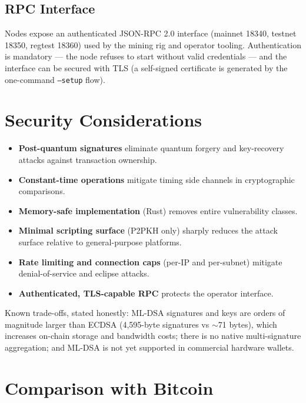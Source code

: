 \documentclass[11pt,a4paper]{article}
\begin{document}
\subsection{RPC Interface}

Nodes expose an authenticated JSON-RPC 2.0 interface (mainnet 18340, testnet 18350, regtest 18360) used by the mining rig and operator tooling. Authentication is mandatory --- the node refuses to start without valid credentials --- and the interface can be secured with TLS (a self-signed certificate is generated by the one-command \texttt{--setup} flow).

\section{Security Considerations}

\begin{itemize}[leftmargin=1.5em,itemsep=2pt]
\item \textbf{Post-quantum signatures} eliminate quantum forgery and key-recovery attacks against transaction ownership.
\item \textbf{Constant-time operations} mitigate timing side channels in cryptographic comparisons.
\item \textbf{Memory-safe implementation} (Rust) removes entire vulnerability classes.
\item \textbf{Minimal scripting surface} (P2PKH only) sharply reduces the attack surface relative to general-purpose platforms.
\item \textbf{Rate limiting and connection caps} (per-IP and per-subnet) mitigate denial-of-service and eclipse attacks.
\item \textbf{Authenticated, TLS-capable RPC} protects the operator interface.
\end{itemize}

Known trade-offs, stated honestly: ML-DSA signatures and keys are orders of magnitude larger than ECDSA (4{,}595-byte signatures vs $\sim$71 bytes), which increases on-chain storage and bandwidth costs; there is no native multi-signature aggregation; and ML-DSA is not yet supported in commercial hardware wallets.

\section{Comparison with Bitcoin}
\end{document}
